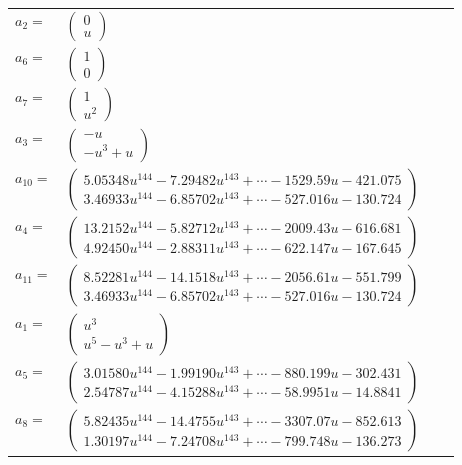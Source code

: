 \documentclass[1p]{elsarticle_modified}
\theoremstyle{definition}
\begin{document}
\begin{tabular}{m{7pt} m{180pt} m{7pt} m{180pt} }
\flushright $a_{2}=$&$\begin{pmatrix}0\\u\end{pmatrix}$ \\
\flushright $a_{6}=$&$\begin{pmatrix}1\\0\end{pmatrix}$ \\
\flushright $a_{7}=$&$\begin{pmatrix}1\\u^2\end{pmatrix}$ \\
\flushright $a_{3}=$&$\begin{pmatrix}- u\\- u^3+u\end{pmatrix}$ \\
\flushright $a_{10}=$&$\begin{pmatrix}5.05348 u^{144}-7.29482 u^{143}+\cdots-1529.59 u-421.075\\3.46933 u^{144}-6.85702 u^{143}+\cdots-527.016 u-130.724\end{pmatrix}$ \\
\flushright $a_{4}=$&$\begin{pmatrix}13.2152 u^{144}-5.82712 u^{143}+\cdots-2009.43 u-616.681\\4.92450 u^{144}-2.88311 u^{143}+\cdots-622.147 u-167.645\end{pmatrix}$ \\
\flushright $a_{11}=$&$\begin{pmatrix}8.52281 u^{144}-14.1518 u^{143}+\cdots-2056.61 u-551.799\\3.46933 u^{144}-6.85702 u^{143}+\cdots-527.016 u-130.724\end{pmatrix}$ \\
\flushright $a_{1}=$&$\begin{pmatrix}u^3\\u^5- u^3+u\end{pmatrix}$ \\
\flushright $a_{5}=$&$\begin{pmatrix}3.01580 u^{144}-1.99190 u^{143}+\cdots-880.199 u-302.431\\2.54787 u^{144}-4.15288 u^{143}+\cdots-58.9951 u-14.8841\end{pmatrix}$ \\
\flushright $a_{8}=$&$\begin{pmatrix}5.82435 u^{144}-14.4755 u^{143}+\cdots-3307.07 u-852.613\\1.30197 u^{144}-7.24708 u^{143}+\cdots-799.748 u-136.273\end{pmatrix}$ \\

\end{tabular}
\end{document}
